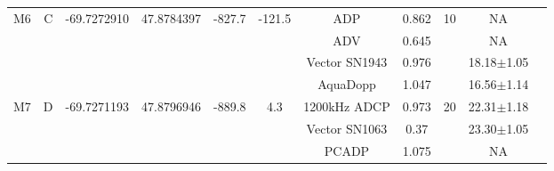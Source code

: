 \documentclass[letterpaper,10pt,landscape]{article}
\begin{document}
\begin{table}
\begin{tabular}{|c|c|c|c|c|c|c|c|c|c|c|}
      \multirow{4}{*}{M6} & \multirow{4}{*}{C} & \multirow{4}{*}{-69.7272910} & \multirow{4}{*}{47.8784397} & \multirow{4}{*}{-827.7}   & \multirow{4}{*}{-121.5} & ADP                & 0.862      & \multirow{4}{*}{10} & NA                & \\ 
                          &                    &                              &                             &                           &                         & ADV                & 0.645      &                     & NA                & \\ 
                          &                    &                              &                             &                           &                         & Vector SN1943      & 0.976      &                     & 18.18$\pm$1.05    & \\ 
                          &                    &                              &                             &                           &                         & AquaDopp           & 1.047      &                     & 16.56$\pm$1.14    & \\ \hline
                                                                                                                                                                                                                          
      \multirow{3}{*}{M7} & \multirow{3}{*}{D} & \multirow{3}{*}{-69.7271193} & \multirow{3}{*}{47.8796946} & \multirow{3}{*}{-889.8}   & \multirow{3}{*}{4.3}    & 1200kHz ADCP       & 0.973      & \multirow{3}{*}{20} & 22.31$\pm$1.18    & \\ 
                          &                    &                              &                             &                           &                         & Vector SN1063      & 0.37       &                     & 23.30$\pm$1.05    & \\ 
                          &                    &                              &                             &                           &                         & PCADP              & 1.075      &                     & NA                & \\ \hline
                                                                                                                                                                                                                          

\end{tabular}
\end{table}
\end{document}
